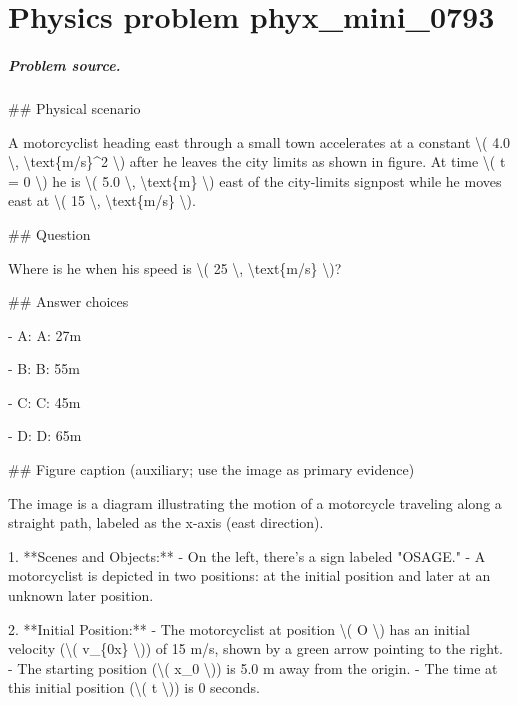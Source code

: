 
\chapter{Physics problem phyx\_mini\_0793}
\label{ch:PhyXMiniProblems_problem_phyx_mini_0793}

\paragraph{Problem source.}
\#\# Physical scenario

A motorcyclist heading east through a small town accelerates at a constant \textbackslash{}( 4.0 \textbackslash{}, \textbackslash{}text\{m/s\}\textasciicircum{}2 \textbackslash{}) after he leaves the city limits as shown in figure. At time \textbackslash{}( t = 0 \textbackslash{}) he is \textbackslash{}( 5.0 \textbackslash{}, \textbackslash{}text\{m\} \textbackslash{}) east of the city-limits signpost while he moves east at \textbackslash{}( 15 \textbackslash{}, \textbackslash{}text\{m/s\} \textbackslash{}).

\#\# Question

Where is he when his speed is \textbackslash{}( 25 \textbackslash{}, \textbackslash{}text\{m/s\} \textbackslash{})?

\#\# Answer choices

- A: A: 27m

- B: B: 55m

- C: C: 45m

- D: D: 65m

\#\# Figure caption (auxiliary; use the image as primary evidence)

The image is a diagram illustrating the motion of a motorcycle traveling along a straight path, labeled as the x-axis (east direction). 

1. **Scenes and Objects:**
   - On the left, there's a sign labeled "OSAGE."
   - A motorcyclist is depicted in two positions: at the initial position and later at an unknown later position.

2. **Initial Position:**
   - The motorcyclist at position \textbackslash{}( O \textbackslash{}) has an initial velocity (\textbackslash{}( v\_\{0x\} \textbackslash{})) of 15 m/s, shown by a green arrow pointing to the right.
   - The starting position (\textbackslash{}( x\_0 \textbackslash{})) is 5.0 m away from the origin.
   - The time at this initial position (\textbackslash{}( t \textbackslash{})) is 0 seconds.

